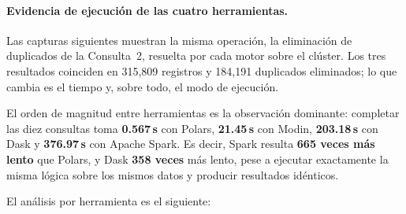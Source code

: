 \paragraph{Evidencia de ejecución de las cuatro herramientas.} Las capturas siguientes muestran la misma operación, la eliminación de duplicados de la Consulta~2, resuelta por cada motor sobre el clúster. Los tres resultados coinciden en 315,809 registros y 184,191 duplicados eliminados; lo que cambia es el tiempo y, sobre todo, el modo de ejecución.




El orden de magnitud entre herramientas es la observación dominante: completar las diez consultas toma \textbf{0.567\,s} con Polars, \textbf{21.45\,s} con Modin, \textbf{203.18\,s} con Dask y \textbf{376.97\,s} con Apache Spark. Es decir, Spark resulta \textbf{665 veces más lento} que Polars, y Dask \textbf{358 veces} más lento, pese a ejecutar exactamente la misma lógica sobre los mismos datos y producir resultados idénticos.

El análisis por herramienta es el siguiente:

